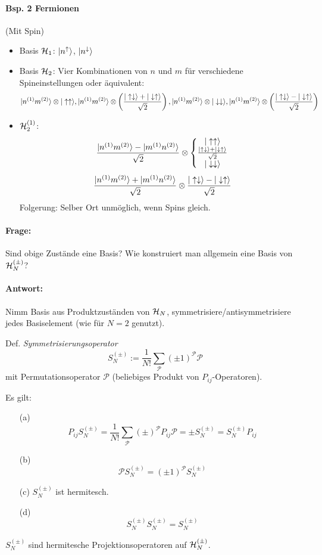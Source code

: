 \documentclass[11pt,a4paper]{report}
\begin{document}
\paragraph{Bsp. 2 Fermionen} (Mit Spin)
\begin{itemize}
\item Basis $\mathcal{H}_1$: $|n^\uparrow\rangle$, $|n^\downarrow\rangle$
\item Basis $\mathcal{H}_2$: Vier Kombinationen von $n$ und $m$ für verschiedene Spineinstellungen oder äquivalent:
$$|n^{(1)}m^{(2)}\rangle\otimes|\uparrow\uparrow\rangle, |n^{(1)}m^{(2)}\rangle\otimes\left(\frac{|\uparrow\downarrow\rangle+|\downarrow\uparrow\rangle}{\sqrt{2}}\right), |n^{(1)}m^{(2)}\rangle\otimes|\downarrow\downarrow\rangle, |n^{(1)}m^{(2)}\rangle\otimes\left(\frac{|\uparrow\downarrow\rangle-|\downarrow\uparrow\rangle}{\sqrt{2}}\right)$$
\item $\mathcal{H}_2^{(1)}$:
$$\frac{|n^{(1)}m^{(2)}\rangle-|m^{(1)}n^{(2)}\rangle}{\sqrt{2}} \otimes\left\{\begin{matrix}
|\uparrow\uparrow\rangle \\ \frac{|\uparrow\downarrow\rangle+|\downarrow\uparrow\rangle}{\sqrt{2}} \\ |\downarrow\downarrow\rangle
\end{matrix}\right.$$
$$ \frac{|n^{(1)}m^{(2)}\rangle+|m^{(1)}n^{(2)}\rangle}{\sqrt{2}}\otimes \frac{|\uparrow\downarrow\rangle-|\downarrow\uparrow\rangle}{\sqrt{2}}$$
Folgerung: Selber Ort unmöglich, wenn Spins gleich.
\end{itemize}

\paragraph{Frage:} Sind obige Zustände eine Basis? Wie konstruiert man allgemein eine Basis von $\mathcal{H}_N^{(\pm )}$?

\paragraph{Antwort:} Nimm Basis aus Produktzuständen von $\mathcal{H}_N$, symmetrisiere/antisymmetrisiere jedes Basiselement (wie für $N=2$ genutzt).\par 

Def. \textit{Symmetrisierungsoperator}
$$S_N^{(\pm )} := \frac{1}{N!}\sum_{\mathcal{P}} (\pm 1)^\mathcal{P}\mathcal{P}$$
mit Permutationsoperator $\mathcal{P}$ (beliebiges Produkt von $P_{ij}$-Operatoren).\par 
Es gilt: 
\begin{itemize}
\item[(a)] $$P_{ij}S_N^{(\pm )} = \frac{1}{N!}\sum_\mathcal{P}(\pm )^\mathcal{P} P_{ij}\mathcal{P} = \pm S_N^{(\pm )}=S_N^{(\pm )}P_{ij}$$
\item[(b)] $$\mathcal{P} S_N^{(\pm )} = (\pm 1)^\mathcal{P} S_N^{ (\pm )}$$
\item[(c)] $S_N^{(\pm )}$ ist hermitesch.
\item[(d)] $$S_N^{(\pm )} S_N^{(\pm )} = S_N^{(\pm )}$$
\end{itemize}
$S_N^{(\pm )}$ sind hermitesche Projektionsoperatoren auf $\mathcal{H}_N^{(\pm )}$.
\end{document}
